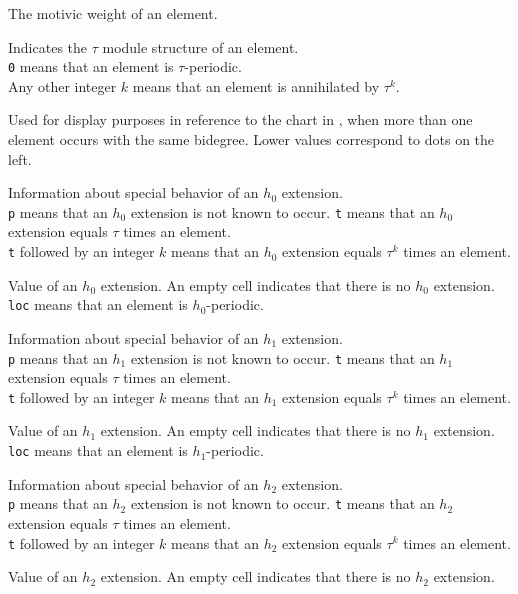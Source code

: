 \documentclass{amsart}
\begin{document}
 The motivic weight of an element.

 Indicates the $\tau$ module structure of an
element. \\
\texttt{0} means that an element is $\tau$-periodic. \\
Any other integer $k$ means that an element is annihilated by $\tau^k$.

 Used for display purposes
in reference to the chart in \cite{IWX19c},
when more than one element occurs with the same bidegree.
Lower values correspond to dots on the left.

Information about special behavior of an $h_0$ extension. \\
\texttt{p} means that an $h_0$ extension is not known to occur.
\texttt{t} means that an $h_0$ extension equals $\tau$ times an element. \\
\texttt{t} followed by an integer $k$ means that an $h_0$ extension
equals $\tau^k$ times an element.

 Value of an $h_0$ extension.  An empty cell indicates
that there is no $h_0$ extension. \\
\texttt{loc} means that an element is $h_0$-periodic.

Information about special behavior of an $h_1$ extension. \\
\texttt{p} means that an $h_1$ extension is not known to occur.
\texttt{t} means that an $h_1$ extension equals $\tau$ times an element. \\
\texttt{t} followed by an integer $k$ means that an $h_1$ extension
equals $\tau^k$ times an element.

Value of an $h_1$ extension.  An empty cell indicates
that there is no $h_1$ extension. \\
\texttt{loc} means that an element is $h_1$-periodic.

Information about special behavior of an $h_2$ extension. \\
\texttt{p} means that an $h_2$ extension is not known to occur.
\texttt{t} means that an $h_2$ extension equals $\tau$ times an element. \\
\texttt{t} followed by an integer $k$ means that an $h_2$ extension
equals $\tau^k$ times an element.

Value of an $h_2$ extension.  An empty cell indicates
that there is no $h_2$ extension.
\end{document}
